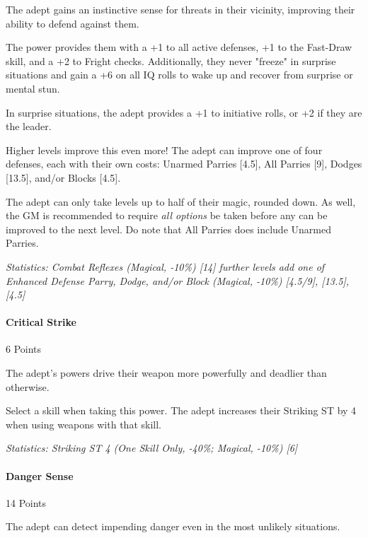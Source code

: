 \begin{multicols*}{3}
	The adept gains an instinctive sense for threats in their vicinity, improving their ability to defend against them. 
	
	The power provides them with a +1 to all active defenses, +1 to the Fast-Draw skill, and a +2 to Fright checks. Additionally, they never "freeze" in surprise situations and gain a +6 on all IQ rolls to wake up and recover from surprise or mental stun.
	
	In surprise situations, the adept provides a +1 to initiative rolls, or +2 if they are the leader.
	
	Higher levels improve this even more! The adept can improve one of four defenses, each with their own costs: Unarmed Parries [4.5], All Parries [9], Dodges [13.5], and/or Blocks [4.5]. 
	
	The adept can only take levels up to half of their magic, rounded down. As well, the GM is recommended to require \textit{all options} be taken before any can be improved to the next level. Do note that All Parries does include Unarmed Parries.

	\textcolor{OliveGreen}{\textit{Statistics: Combat Reflexes (Magical, -10\%) [14] further levels add one of Enhanced Defense Parry, Dodge, and/or Block (Magical, -10\%) [4.5/9], [13.5], [4.5]}} 
	
	\paragraph{Critical Strike}
	\begin{flushright}
		6 Points
	\end{flushright}
	
	The adept's powers drive their weapon more powerfully and deadlier than otherwise. 
	
	Select a skill when taking this power. The adept increases their Striking ST by 4 when using weapons with that skill.
	
	\textcolor{OliveGreen}{\textit{Statistics: Striking ST 4 (One Skill Only, -40\%; Magical, -10\%) [6] }}
	
	\paragraph{Danger Sense}
	\begin{flushright}
		14 Points
	\end{flushright}

	The adept can detect impending danger even in the most unlikely situations. 
	

\end{multicols*}
